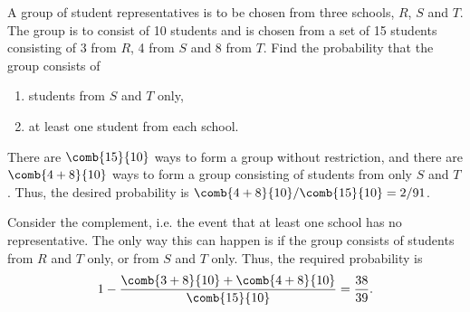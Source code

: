 \begin{problem}
    A group of student representatives is to be chosen from three schools, $R$, $S$ and $T$. The group is to consist of 10 students and is chosen from a set of 15 students consisting of 3 from $R$, 4 from $S$ and 8 from $T$. Find the probability that the group consists of
    \begin{enumerate}
        \item students from $S$ and $T$ only,
        \item at least one student from each school.
    \end{enumerate}
\end{problem}
\begin{solution}
    \begin{ppart}
        There are $\comb{15}{10}$ ways to form a group without restriction, and there are $\comb{4+8}{10}$ ways to form a group consisting of students from only $S$ and $T$. Thus, the desired probability is $\comb{4+8}{10}/\comb{15}{10} = 2/91$.
    \end{ppart}
    \begin{ppart}
        Consider the complement, i.e. the event that at least one school has no representative. The only way this can happen is if the group consists of students from $R$ and $T$ only, or from $S$ and $T$ only. Thus, the required probability is \[1 - \frac{\comb{3 + 8}{10} + \comb{4 + 8}{10}}{\comb{15}{10}} = \frac{38}{39}.\]
    \end{ppart}
\end{solution}

